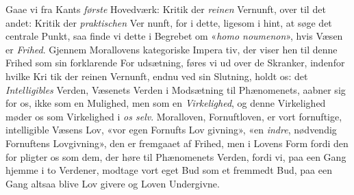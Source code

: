Gaae vi fra Kants \emph{første} Hovedværk: Kritik der \emph{reinen}
Vernunft, over til det andet: Kritik der \emph{praktischen} Ver\-%
nunft, for i dette, ligesom i hint, at søge det centrale Punkt,
saa finde vi dette i Begrebet om «\emph{homo noumenon}», hvis
Væsen er \emph{Frihed}. Gjennem Morallovens kategoriske Impera\-%
tiv, der viser hen til denne Frihed som sin forklarende For\-%
udsætning, føres vi ud over de Skranker, indenfor hvilke Kri\-%
tik der reinen Vernunft, endnu ved sin Slutning, holdt os:
det \emph{Intelligibles} Verden, Væsenets Verden i Modsætning til
Phænomenets, aabner sig for os, ikke som en Mulighed, men
som en \emph{Virkelighed}, og denne Virkelighed møder os som
Virkelighed i \emph{os selv}. Moralloven, Fornuftloven, er vort
fornuftige, intelligible Væsens Lov, «vor egen Fornufts Lov\-%
givning», «en \emph{indre}, nødvendig Fornuftens Lovgivning», den
er fremgaaet af Frihed, men i Lovens Form fordi den for\-%
pligter os som dem, der høre til Phænomenets Verden, fordi
vi, paa een Gang hjemme i to Verdener, modtage vort eget
Bud som et fremmedt Bud, paa een Gang altsaa blive Lov\-%
givere og Loven Undergivne.

